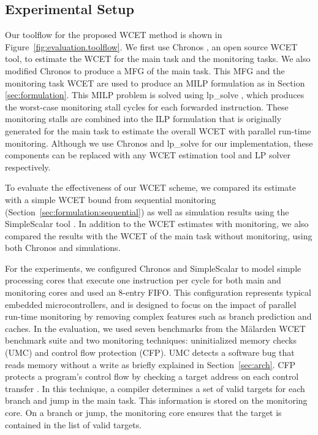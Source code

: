 \vspace{-0.0in}
\subsection{Experimental Setup}

Our toolflow for the proposed WCET method is shown in Figure~\ref{fig:evaluation.toolflow}. We
first use Chronos \cite{chronos-tool}, an open source WCET tool, to estimate
the WCET for the main task and the monitoring tasks. We also modified Chronos
to produce a MFG of the main task. This MFG and the monitoring task WCET are used to produce an MILP formulation as in
Section \ref{sec:formulation}. This MILP problem is solved
using lp\_solve \cite{lpsolve}, which produces the worst-case monitoring stall cycles for each forwarded
instruction. These monitoring stalls are combined into the ILP formulation that 
is originally generated for the main task to estimate the overall
WCET with parallel run-time monitoring. Although we use Chronos and lp\_solve
for our implementation, these components can be replaced with any WCET
estimation tool and LP solver respectively.

To evaluate the effectiveness of our WCET scheme, we compared its estimate
with a simple WCET bound from sequential monitoring (Section~\ref{sec:formulation:sequential})
as well as simulation results using the SimpleScalar tool \cite{simplescalar}.
In addition to the WCET estimates with monitoring, we also compared the results with
the WCET of the main task without monitoring, using both Chronos and simulations. 


For the experiments, we configured Chronos and SimpleScalar to model simple processing cores
that execute one instruction per cycle for both main and monitoring cores and used an 8-entry FIFO.
This configuration represents typical embedded microcontrollers, and is designed to focus on 
the impact of parallel run-time monitoring by removing complex features such as branch prediction 
and caches.
In the evaluation, we used seven benchmarks from the M\"alarden WCET benchmark suite \cite{malarden} 
and two monitoring techniques: uninitialized memory checks (UMC) and control flow protection (CFP).
UMC detects a software bug that reads memory without a write as briefly explained in 
Section~\ref{sec:arch}. CFP protects a program's control flow by checking a target address on
each control transfer \cite{arora-runtime05}. In this technique, a compiler determines a set of valid
targets for each branch and jump in the main task.
This information is stored on the monitoring core. 
On a branch or jump, the monitoring core ensures that the target is
contained in the list of valid targets.


